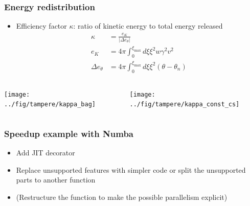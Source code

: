 \begin{frame}
    \frametitle{Energy redistribution}
    \begin{itemize}
        \item Efficiency factor $\kappa$: ratio of kinetic energy to total energy released
        \begin{align}
            \kappa &= \frac{e_K}{|\Delta e_\theta|} \\
            e_K &= 4 \pi \int_0^{\xi_\text{max}} d\xi \xi^2 w \gamma^2 v^2 \\
            \Delta e_{\theta} &= 4 \pi \int_0^{\xi_\text{max}} d\xi \xi^2 (\theta - \theta_n)
        \end{align}
    \end{itemize}
    \begin{columns}
    \begin{column}{0.35\textwidth}
        \texttt{[image: ../fig/tampere/kappa\_bag]}
    \end{column}
    \begin{column}{0.35\textwidth}
        \texttt{[image: ../fig/tampere/kappa\_const\_cs]}
    \end{column}
    \end{columns}
\end{frame}

\begin{frame}
    \frametitle{Speedup example with Numba}
    \begin{itemize}
        \item Add JIT decorator
        \item Replace unsupported features with simpler code or split the unsupported parts to another function
        \item (Restructure the function to make the possible parallelism explicit)
    \end{itemize}
    {
        \scriptsize
        
    }
\end{frame}
